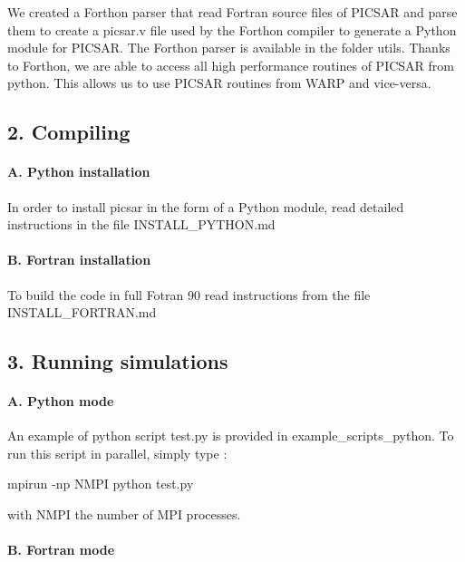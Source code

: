 We created a Forthon parser that read Fortran source files of P\+I\+C\+S\+AR and parse them to create a {\ttfamily picsar.\+v} file used by the Forthon compiler to generate a Python module for P\+I\+C\+S\+AR. The Forthon parser is available in the folder {\ttfamily utils}. Thanks to Forthon, we are able to access all high performance routines of P\+I\+C\+S\+AR from python. This allows us to use P\+I\+C\+S\+AR routines from W\+A\+RP and vice-\/versa.

\subsection*{2. Compiling }

\paragraph*{A. Python installation}

In order to install picsar in the form of a Python module, read detailed instructions in the file {\ttfamily I\+N\+S\+T\+A\+L\+L\+\_\+\+P\+Y\+T\+H\+O\+N.\+md}

\paragraph*{B. Fortran installation}

To build the code in full Fotran 90 read instructions from the file {\ttfamily I\+N\+S\+T\+A\+L\+L\+\_\+\+F\+O\+R\+T\+R\+A\+N.\+md}

\subsection*{3. Running simulations }

\paragraph*{A. Python mode}

An example of python script {\ttfamily test.\+py} is provided in {\ttfamily example\+\_\+scripts\+\_\+python}. To run this script in parallel, simply type \+: 
\begin{DoxyCode}
mpirun -np NMPI python test.py 
\end{DoxyCode}
 with N\+M\+PI the number of M\+PI processes.

\paragraph*{B. Fortran mode}

